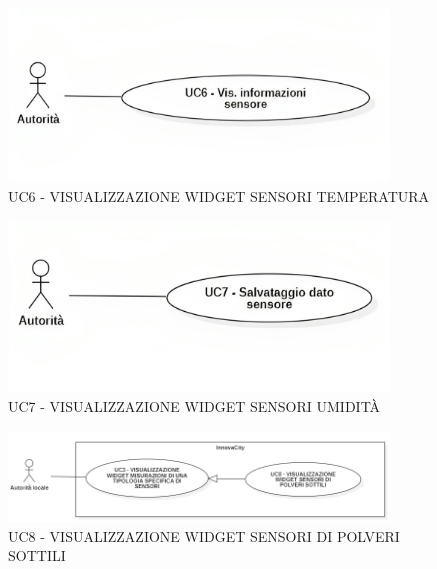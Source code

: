 


\begin{figure}[H]
    \centering
    \includegraphics[width=0.9\textwidth]{../Images/uc6.png}
    \caption{UC6 - VISUALIZZAZIONE WIDGET SENSORI TEMPERATURA}
    \label{fig:UC6}
\end{figure}


\begin{figure}[H]
    \centering
    \includegraphics[width=0.9\textwidth]{../Images/uc7.png}
    \caption{UC7 - VISUALIZZAZIONE WIDGET SENSORI UMIDITÀ}
    \label{fig:UC6_sub}
\end{figure}


\begin{figure}[H]
    \centering
    \includegraphics[width=0.9\textwidth]{../Images/uc8.PNG}
    \caption{UC8 - VISUALIZZAZIONE WIDGET SENSORI DI POLVERI SOTTILI}
    \label{fig:UC6_sub}
\end{figure}

